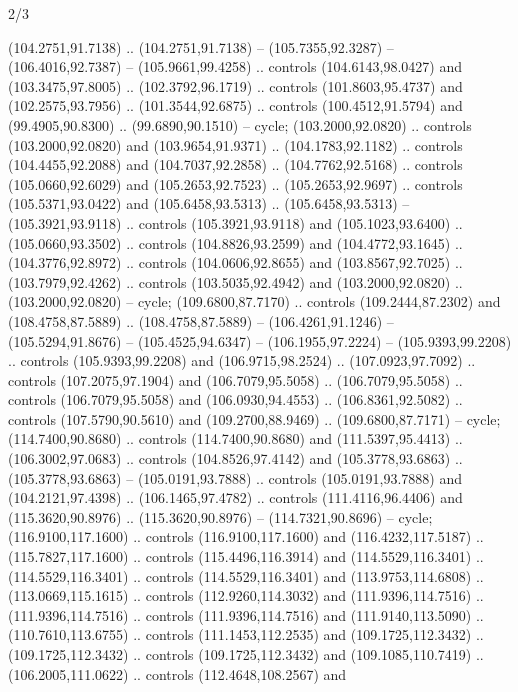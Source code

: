 \begin{flagdescription}{2/3}
\begin{scope}[scale=0.00214\flagwidth,yshift=164.5mm]
\begin{scope}[y=-0.8pt, x=0.8pt, inner sep=0pt, outer sep=0pt]
\begin{scope}[draw=black,fill=dark,line width=0.162pt]
  (104.2751,91.7138) .. (104.2751,91.7138) -- (105.7355,92.3287) --
  (106.4016,92.7387) -- (105.9661,99.4258) .. controls (104.6143,98.0427) and
  (103.3475,97.8005) .. (102.3792,96.1719) .. controls (101.8603,95.4737) and
  (102.2575,93.7956) .. (101.3544,92.6875) .. controls (100.4512,91.5794) and
  (99.4905,90.8300) .. (99.6890,90.1510) -- cycle;
 (103.2000,92.0820) .. controls (103.2000,92.0820) and
  (103.9654,91.9371) .. (104.1783,92.1182) .. controls (104.4455,92.2088) and
  (104.7037,92.2858) .. (104.7762,92.5168) .. controls (105.0660,92.6029) and
  (105.2653,92.7523) .. (105.2653,92.9697) .. controls (105.5371,93.0422) and
  (105.6458,93.5313) .. (105.6458,93.5313) -- (105.3921,93.9118) .. controls
  (105.3921,93.9118) and (105.1023,93.6400) .. (105.0660,93.3502) .. controls
  (104.8826,93.2599) and (104.4772,93.1645) .. (104.3776,92.8972) .. controls
  (104.0606,92.8655) and (103.8567,92.7025) .. (103.7979,92.4262) .. controls
  (103.5035,92.4942) and (103.2000,92.0820) .. (103.2000,92.0820) -- cycle;
 (109.6800,87.7170) .. controls (109.2444,87.2302) and
  (108.4758,87.5889) .. (108.4758,87.5889) -- (106.4261,91.1246) --
  (105.5294,91.8676) -- (105.4525,94.6347) -- (106.1955,97.2224) --
  (105.9393,99.2208) .. controls (105.9393,99.2208) and (106.9715,98.2524) ..
  (107.0923,97.7092) .. controls (107.2075,97.1904) and (106.7079,95.5058) ..
  (106.7079,95.5058) .. controls (106.7079,95.5058) and (106.0930,94.4553) ..
  (106.8361,92.5082) .. controls (107.5790,90.5610) and (109.2700,88.9469) ..
  (109.6800,87.7171) -- cycle;
 (114.7400,90.8680) .. controls (114.7400,90.8680) and
  (111.5397,95.4413) .. (106.3002,97.0683) .. controls (104.8526,97.4142) and
  (105.3778,93.6863) .. (105.3778,93.6863) -- (105.0191,93.7888) .. controls
  (105.0191,93.7888) and (104.2121,97.4398) .. (106.1465,97.4782) .. controls
  (111.4116,96.4406) and (115.3620,90.8976) .. (115.3620,90.8976) --
  (114.7321,90.8696) -- cycle;
 (116.9100,117.1600) .. controls (116.9100,117.1600) and
  (116.4232,117.5187) .. (115.7827,117.1600) .. controls (115.4496,116.3914) and
  (114.5529,116.3401) .. (114.5529,116.3401) .. controls (114.5529,116.3401) and
  (113.9753,114.6808) .. (113.0669,115.1615) .. controls (112.9260,114.3032) and
  (111.9396,114.7516) .. (111.9396,114.7516) .. controls (111.9396,114.7516) and
  (111.9140,113.5090) .. (110.7610,113.6755) .. controls (111.1453,112.2535) and
  (109.1725,112.3432) .. (109.1725,112.3432) .. controls (109.1725,112.3432) and
  (109.1085,110.7419) .. (106.2005,111.0622) .. controls (112.4648,108.2567) and

\end{scope}
\end{scope}
\end{scope}
\end{flagdescription}

